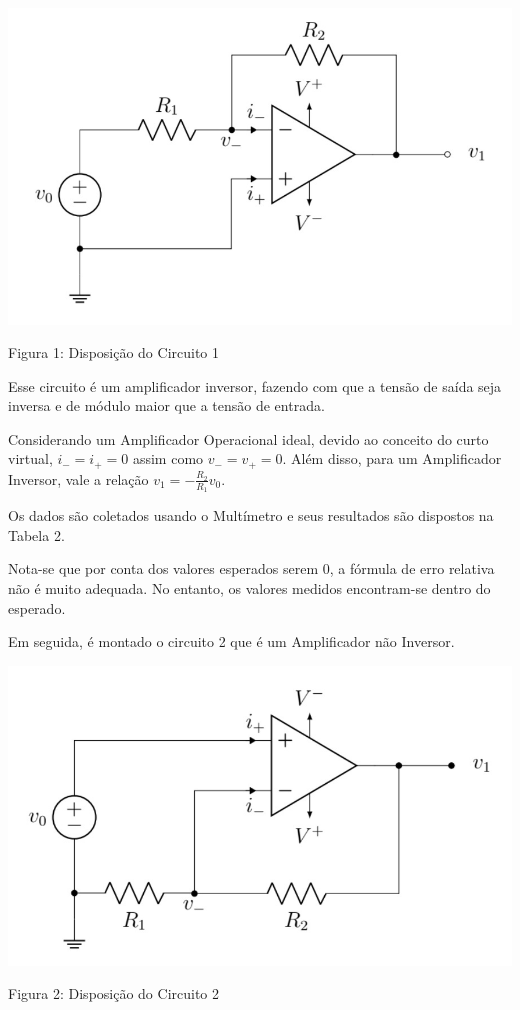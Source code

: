 \documentclass[a4 paper]{article}
\begin{document}
\begin{table}[h]
\centering
\includegraphics[scale=0.4]{figuras/circuito1}
\end{table}
\begin{center}
Figura 1: Disposição do Circuito 1
\end{center}

Esse circuito é um amplificador inversor, fazendo com que a tensão de saída seja inversa e de módulo maior que a tensão de entrada. 

Considerando um Amplificador Operacional ideal, devido ao conceito do curto virtual, $i_-=i_+=0$ assim como $v_-=v_+ =0$. Além disso, para um Amplificador Inversor, vale a relação $v_1=-\frac{R_2}{R_1}v_0$.

Os dados são coletados usando o Multímetro e seus resultados são dispostos na Tabela 2.



Nota-se que por conta dos valores esperados serem 0, a fórmula de erro relativa não é muito adequada. No entanto, os valores medidos encontram-se dentro do esperado.

\newpage
Em seguida, é montado o circuito 2 que é um Amplificador não Inversor.

\begin{table}[h]
\centering
\includegraphics[scale=0.4]{figuras/circuito2}
\end{table}
\begin{center}
Figura 2: Disposição do Circuito 2
\end{center}
\end{document}
